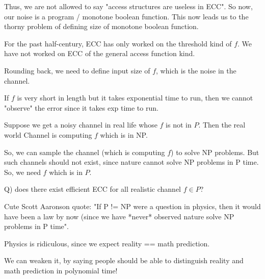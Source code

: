 \begin{itemize}
        Thus, we are not allowed to say "access structures are useless in ECC".
        So now, our noise is a program / monotone boolean function.  This now
        leads us to the thorny problem of defining size of monotone
        boolean function.


        For the past half-century, ECC has only worked on the threshold
        kind of $f$. We have not worked on ECC of the general access
        function kind.

        Rounding back, we need to define input size of $f$, which is the
        noise in the channel.
        
        If $f$ is very short in length but it takes exponential time to run, then we cannot
        "observe" the error since it takes exp time to run.

        Suppose we get a noisy channel in real life whose $f$ is not in $P$. Then the
        real world Channel is computing $f$ which is in NP.
        
        So, we can sample the channel (which is computing $f$) to solve NP
        problems. But such channels should not exist, since nature
        cannot solve NP problems in P time. So, we need
        $f$ which is in $P$.

        Q) does there exist efficient ECC for all realistic channel $f \in P$?

        Cute Scott Aaronson quote: "If P != NP were a question in physics, then
        it would have been a law by now (since we have *never* observed nature
        solve NP problems in P time".

        
\end{itemize}


Physics is ridiculous, since we expect reality == math prediction.

We can weaken it, by saying people should be able to distinguish reality 
and math prediction in polynomial time!
